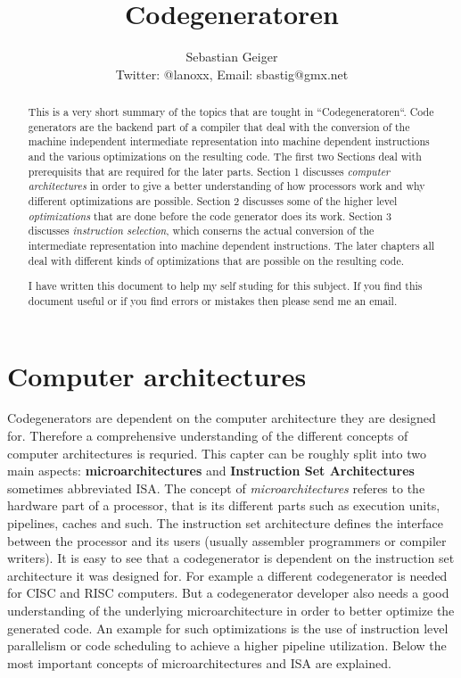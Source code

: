 \documentclass[a4paper,10pt]{article}
\title{Codegeneratoren}
\author{Sebastian Geiger\\ \small{Twitter: @lanoxx, Email: sbastig@gmx.net}}
\begin{document}
\maketitle

\begin{abstract}
This is a very short summary of the topics that are tought in ``Codegeneratoren``. Code generators are the backend part of a compiler 
that deal with the conversion of the machine independent intermediate representation into machine dependent instructions and the various 
optimizations on the resulting code. The first two Sections deal with prerequisits that are required for the later parts. Section 1 
discusses \textit{computer architectures} in order to give a better understanding of how processors work and why different optimizations 
are possible. Section 2 discusses some of the higher level \textit{optimizations} that are done before the code generator does its work. 
Section 3 discusses \textit{instruction selection}, which conserns the actual conversion of the intermediate representation into machine 
dependent instructions. The later chapters all deal with different kinds of optimizations that are possible on the resulting code.

I have written this document to help my self studing for this subject. If you find this document useful or if you find errors or mistakes 
then please send me an email.
\end{abstract}

\tableofcontents

\section{Computer architectures}
Codegenerators are dependent on the computer architecture they are designed for. Therefore a comprehensive understanding of the different 
concepts of computer architectures is requried. This capter can be roughly split into two main aspects: \textbf{microarchitectures} and 
\textbf{Instruction Set Architectures} sometimes abbreviated ISA. The concept of \textit{microarchitectures} referes to the hardware part 
of a processor, that is its different parts such as execution units, pipelines, caches and such. The instruction set architecture defines 
the interface between the processor and its users (usually assembler programmers or compiler writers). It is easy to see that a 
codegenerator is dependent on the instruction set architecture it was designed for. For example a different codegenerator is needed for 
CISC and RISC computers. But a codegenerator developer also needs a good understanding of the underlying microarchitecture in order to 
better optimize the generated code. An example for such optimizations is the use of instruction level parallelism or code scheduling to 
achieve a higher pipeline utilization. Below the most important concepts of microarchitectures and ISA are explained.
\end{document}
